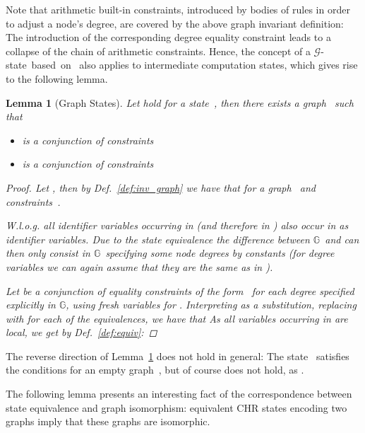 \documentclass{tlp}
\newtheorem{lemma}[theorem]{Lemma}
\newcommand{\mcG}{\ensuremath{\mathcal{G}}}
\newcommand{\bbG}{\ensuremath{\mathbb{G}}}
\begin{document}
Note that arithmetic built-in constraints, introduced by bodies of rules in order
to adjust a node's degree, are covered by the above graph invariant definition:
The introduction of the corresponding degree equality constraint leads to a
collapse of the chain of arithmetic constraints. Hence, the concept of a
\mcG-state~based~on~ also applies to intermediate computation states, which
gives rise to the following lemma.

\begin{lemma}[Graph States]\label{lem:graph_states} Let  hold for a
state~, then there exists a graph~ such that 
\begin{itemize}
  \item  is a conjunction of  constraints
  \item  is a conjunction of 
  constraints
\end{itemize}
\begin{proof}

Let , then by Def.~\ref{def:inv_graph} we have
that  for a graph~ and  constraints~.

W.l.o.g. all identifier variables occurring in  (and therefore in
) also occur in  as identifier variables. Due to the state
equivalence the difference between \bbG\ and  can then only consist
in \bbG\ specifying some node degrees by constants (for degree variables we can
again assume that they are the same as in ).

Let  be a conjunction of equality constraints of the form~ for each
degree specified explicitly in \bbG, using fresh variables for . Interpreting
 as a substitution, replacing  with  for each of the equivalences,
we have that  As all
variables occurring in  are local, we get by
Def.~\ref{def:equiv}:
\end{proof}
\end{lemma}

The reverse direction of Lemma~\ref{lem:graph_states} does not hold in
general: The state~ satisfies the conditions for an empty graph~, but of
course  does not hold, as .

The following lemma presents an interesting fact of the correspondence between
state equivalence and graph isomorphism: equivalent CHR states encoding two
graphs imply that these graphs are isomorphic.
\end{document}
